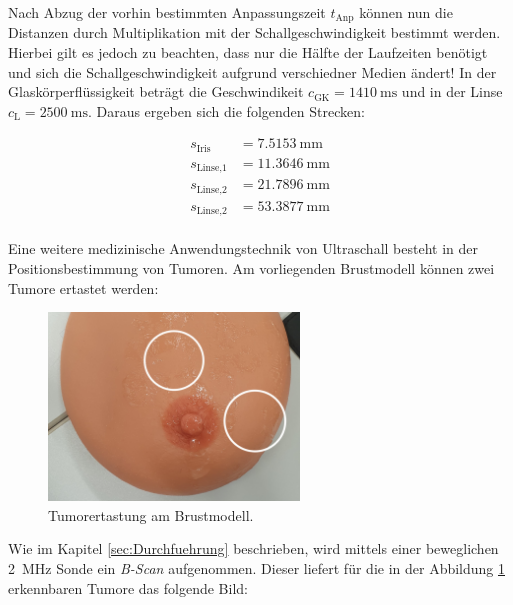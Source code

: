 \noindent Nach Abzug der vorhin bestimmten Anpassungszeit $t_\text{Anp}$ können nun die Distanzen durch Multiplikation mit der 
Schallgeschwindigkeit bestimmt werden. Hierbei gilt es jedoch zu beachten, dass nur die Hälfte der Laufzeiten benötigt und sich 
die Schallgeschwindigkeit aufgrund verschiedner Medien ändert! In der Glaskörperflüssigkeit beträgt die Geschwindikeit $c_\text{GK}=
\qty{1410}{\meter\second}$ und in der Linse $c_\text{L} = \qty{2500}{\meter\second}$. Daraus ergeben sich die folgenden Strecken:


\begin{align*}
    s_\text{Iris} &= \qty{7.5153}{\milli\meter}     \\
    s_\text{Linse,1} &= \qty{11.3646}{\milli\meter} \\
    s_\text{Linse,2} &= \qty{21.7896}{\milli\meter} \\
    s_\text{Linse,2} &= \qty{53.3877}{\milli\meter} \\
\end{align*}

\noindent Eine weitere medizinische Anwendungstechnik von Ultraschall besteht in der Positionsbestimmung von Tumoren. Am vorliegenden 
Brustmodell können zwei Tumore ertastet werden:

\begin{figure}
    \centering
    \includegraphics[height=5cm]{Tumororientierung2.jpg}
    \caption{Tumorertastung am Brustmodell.}
    \label{fig:Brust}
\end{figure}

\noindent Wie im Kapitel \ref{sec:Durchfuehrung} beschrieben, wird mittels einer beweglichen \qty{2}{\mega\hertz} Sonde ein 
\emph{B-Scan} aufgenommen. Dieser liefert für die in der Abbildung \ref{fig:Brust} erkennbaren Tumore das folgende Bild:


